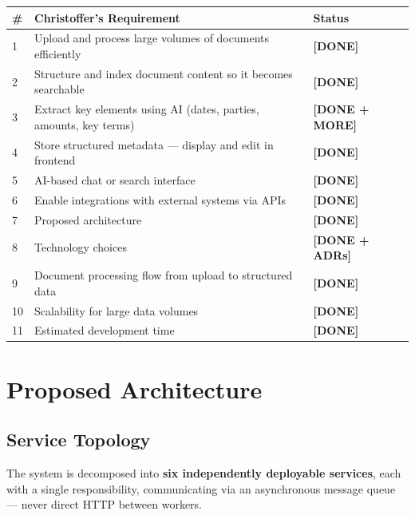 \documentclass[12pt,a4paper]{article}
\newcommand{\goodbadge}[1]{\textcolor{NordicGreen}{\textbf{[#1]}}}
\begin{document}
\begin{tabularx}{\textwidth}{lXl}
\toprule
\textbf{\#} & \textbf{Christoffer's Requirement} & \textbf{Status} \\
\midrule
1 & Upload and process large volumes of documents efficiently
  & \goodbadge{DONE} \\
2 & Structure and index document content so it becomes searchable
  & \goodbadge{DONE} \\
3 & Extract key elements using AI (dates, parties, amounts, key terms)
  & \goodbadge{DONE + MORE} \\
4 & Store structured metadata — display and edit in frontend
  & \goodbadge{DONE} \\
5 & AI-based chat or search interface
  & \goodbadge{DONE} \\
6 & Enable integrations with external systems via APIs
  & \goodbadge{DONE} \\
7 & Proposed architecture
  & \goodbadge{DONE} \\
8 & Technology choices
  & \goodbadge{DONE + ADRs} \\
9 & Document processing flow from upload to structured data
  & \goodbadge{DONE} \\
10 & Scalability for large data volumes
   & \goodbadge{DONE} \\
11 & Estimated development time
   & \goodbadge{DONE} \\
\bottomrule
\end{tabularx}

\newpage

\section{Proposed Architecture}

\subsection{Service Topology}

The system is decomposed into \textbf{six independently deployable services}, each with a single responsibility, communicating via an asynchronous message queue — never direct HTTP between workers.
\end{document}

